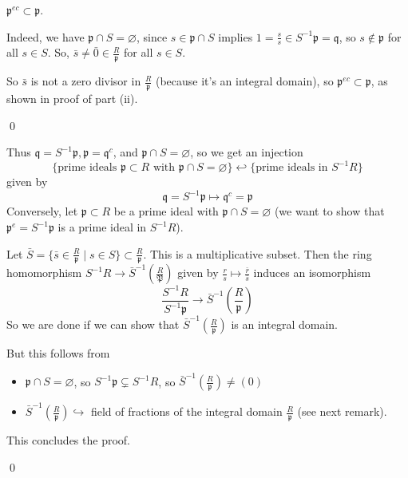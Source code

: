 \documentclass[x11names,reqno,14pt]{extarticle}
\newcommand{\mk}[1]{\mathfrak{#1}}
\begin{document}
\begin{enumerate}[label=(\roman*)]
\claim 

$\mk{p}^{ec} \subset \mk{p}$. 

\proof

Indeed, we have $\mk{p} \cap S = \varnothing$, since $s \in \mk{p} \cap S$ implies $1 = \frac{s}{s} \in S^{-1}\mk{p} = \mk{q}$, so $s\not\in\mk{p}$ for all $s \in S$. So, $\bar{s}\neq\bar{0}\in\frac{R}{\mk{p}}$ for all $s \in S$. 

So $\bar{s}$ is not a zero divisor in $\frac{R}{\mk{p}}$ (because it's an integral domain), so $\mk{p}^{ec} \subset \mk{p}$, as shown in proof of part (ii). 

\qed

Thus $\mk{q} = S^{-1}\mk{p}, \mk{p} = \mk{q}^c$, and $\mk{p} \cap S = \varnothing$, so we get an injection 
\[
\{\text{prime ideals }\mk{p}\subset R\text{ with }\mk{p} \cap S = \varnothing\} \hookleftarrow \{\text{prime ideals in }S^{-1}R \}
\]
given by 
\[
\mk{q} = S^{-1}\mk{p} \mapsto \mk{q}^c = \mk{p}
\]
Conversely, let $\mk{p} \subset R$ be a prime ideal with $\mk{p} \cap S = \varnothing$ (we want to show that $\mk{p}^e = S^{-1}\mk{p}$ is a prime ideal in $S^{-1}R$). 

Let $\bar{S} = \{\bar{s}\in\frac{R}{\mk{p}} \mid s \in S\} \subset \frac{R}{\mk{p}}$. This is a multiplicative subset. Then the ring homomorphism $S^{-1}R\to \bar{S}^{-1}(\frac{R}{\mk{P}})$ given by $\frac{r}{s} \mapsto \frac{\bar{r}}{\bar{s}}$ induces an isomorphism
\[
\frac{S^{-1}R}{S^{-1}\mk{p}} \to \bar{S}^{-1}(\frac{R}{\mk{p}})
\]
So we are done if we can show that $\bar{S}^{-1}(\frac{R}{\mk{p}})$ is an integral domain. 

But this follows from

\begin{itemize}

\item $\mk{p} \cap S = \varnothing$, so $S^{-1}\mk{p}\subsetneq S^{-1}R$, so $\bar{S}^{-1}(\frac{R}{\mk{p}})\neq(0)$

\item $\bar{S}^{-1}(\frac{R}{\mk{p}})\hookrightarrow$ field of fractions of the integral domain $\frac{R}{\mk{p}}$ (see next remark). 

\end{itemize}

This concludes the proof.

\end{enumerate}

\qed

\rem
\end{document}
